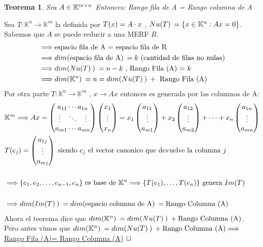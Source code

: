 \documentclass[]{article}
\newtheorem{theorem}{Teorema}
\newenvironment{proof}{\noindent{\bf Prueba:}}{$\hfill \Box$ \vspace{10pt}}
\newcommand{\K}{
    \mathbb{K}
}
\newcommand{\ida}{\Longrightarrow}
\begin{document}
\begin{theorem}
    Sea $A \in \text{$\mathbb{K}^{m \times n}$}$ Entonces: Rango fila de A = Rango columna de A
\end{theorem}
\begin{proof}
    Sea $T:\K^{n}\to\K^{m}$ la \tl definida por $\text{$T({x})$}=A \cdot x$ , $\N=\conjunto{x \in \K^n : Ax=0}$.\\
    Sabemos que $A$ se puede reducir a una MERF $R$.
    \begin{align*}
        &\ida \text{espacio fila de A = espacio fila de R}\\
        &\ida \dm{\text{espacio fila de A}} = k \text{ (cantidad de filas no nulas)}\\
        &\ida \dm{\N}=n-k \text{ , Rango Fila (A) = } k\\ 
        &\ida \dm{\K^n}=n = \dm{\N}+ \text{ Rango Fila (A)}
    \end{align*}
    Por otra parte $T:\K^{n}\to\K^{m}$ , $x \to Ax$ entonces \I es generada por las columnas de A:
    \begin{align*}
        &\K^m \ida Ax =
        \begin{pmatrix} a_{11} \cdots a_{1n} \\ \vdots\quad\ddots\quad \vdots \\ a_{m1} \cdots a_{mn} \end{pmatrix}
        \begin{pmatrix} x_1 \\ \vdots \\ x_n \end{pmatrix} =
        x_1 \begin{pmatrix} a_{11} \\ \vdots \\ a_{m1} \end{pmatrix}+
        x_2 \begin{pmatrix} a_{12} \\ \vdots \\ a_{m2} \end{pmatrix}+
        \cdots +
        x_n \begin{pmatrix} a_{1n} \\ \vdots \\ a_{mn} \end{pmatrix}\\
        & \T{e_j}= \begin{pmatrix} a_{1j} \\ \vdots \\ a_{mj} \end{pmatrix}
        \text{ siendo $e_j$ el vector canonico que devuelve la columna $j$}\\
        \\
        &\ida \conjunto{e_1,e_2,\dots,e_{n-1},e_n} \text{ es base de } \K^n
        \ida \conjunto{\T{e_1},\dots,\T{e_n}} \text{ genera }\I\\
        \\
        &\ida \dm{\I}=\dm{\text{espacio columna de A}}=\text{Rango Columna (A)}
    \end{align*}
    Ahora el teorema dice que $\dm{\K^n}=\dm{\N}+\text{Rango Columna (A)}$. Pero antes vimos que
    $\dm{\K^n}=\dm{\N}+\text{Rango Columna (A)} \ida$ \underline{Rango Fila (A)= Rango Columna (A)}
\end{proof}
\end{document}
